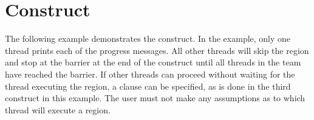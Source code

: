 \section{ Construct}
\label{sec:single}

The following example demonstrates the  construct. In the example, 
only one thread prints each of the progress messages. All other threads will skip 
the  region and stop at the barrier at the end of the  
construct until all threads in the team have reached the barrier. If other threads 
can proceed without waiting for the thread executing the  region, 
a  clause can be specified, as is done in the third  
construct in this example. The user must not make any assumptions as to which thread 
will execute a  region.




